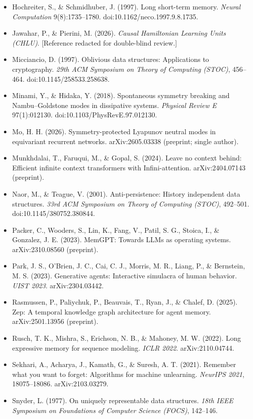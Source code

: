 \documentclass{article}
\begin{document}
{\begin{itemize}
\item Hochreiter, S., \& Schmidhuber, J. (1997). Long short-term memory. \emph{Neural Computation} 9(8):1735--1780. doi:10.1162/neco.1997.9.8.1735.
\item Jawahar, P., \& Pierini, M. (2026). \emph{Causal Hamiltonian Learning Units (CHLU)}. [Reference redacted for double-blind review.]
\item Micciancio, D. (1997). Oblivious data structures: Applications to cryptography. \emph{29th ACM Symposium on Theory of Computing (STOC)}, 456--464. doi:10.1145/258533.258638.
\item Minami, Y., \& Hidaka, Y. (2018). Spontaneous symmetry breaking and Nambu--Goldstone modes in dissipative systems. \emph{Physical Review E} 97(1):012130. doi:10.1103/PhysRevE.97.012130.
\item Mo, H. H. (2026). Symmetry-protected Lyapunov neutral modes in equivariant recurrent networks. arXiv:2605.03338 (preprint; single author).
\item Munkhdalai, T., Faruqui, M., \& Gopal, S. (2024). Leave no context behind: Efficient infinite context transformers with Infini-attention. arXiv:2404.07143 (preprint).
\item Naor, M., \& Teague, V. (2001). Anti-persistence: History independent data structures. \emph{33rd ACM Symposium on Theory of Computing (STOC)}, 492--501. doi:10.1145/380752.380844.
\item Packer, C., Wooders, S., Lin, K., Fang, V., Patil, S. G., Stoica, I., \& Gonzalez, J. E. (2023). MemGPT: Towards LLMs as operating systems. arXiv:2310.08560 (preprint).
\item Park, J. S., O'Brien, J. C., Cai, C. J., Morris, M. R., Liang, P., \& Bernstein, M. S. (2023). Generative agents: Interactive simulacra of human behavior. \emph{UIST 2023}. arXiv:2304.03442.
\item Rasmussen, P., Paliychuk, P., Beauvais, T., Ryan, J., \& Chalef, D. (2025). Zep: A temporal knowledge graph architecture for agent memory. arXiv:2501.13956 (preprint).
\item Rusch, T. K., Mishra, S., Erichson, N. B., \& Mahoney, M. W. (2022). Long expressive memory for sequence modeling. \emph{ICLR 2022}. arXiv:2110.04744.
\item Sekhari, A., Acharya, J., Kamath, G., \& Suresh, A. T. (2021). Remember what you want to forget: Algorithms for machine unlearning. \emph{NeurIPS 2021}, 18075--18086. arXiv:2103.03279.
\item Snyder, L. (1977). On uniquely representable data structures. \emph{18th IEEE Symposium on Foundations of Computer Science (FOCS)}, 142--146.

\end{itemize}}
\end{document}
